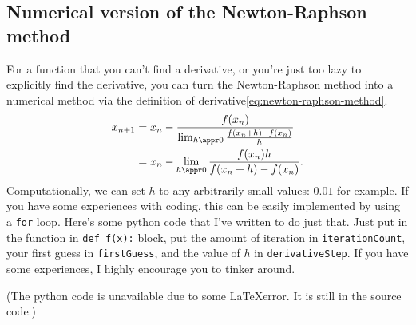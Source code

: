\subsection{Numerical version of the Newton-Raphson method}

For a function that you can't find a derivative, or you're just too lazy to explicitly find the derivative, you can turn the Newton-Raphson method into a numerical method via the definition of derivative\cref{eq:newton-raphson-method}.
\begin{align}
	x_{n + 1} & = x_n - \frac{f(x_n)}{\lim_{h \appr 0}\frac{f(x_n + h) - f(x_n)}{h}} \\
	          & = x_n - \lim_{h \appr 0}\frac{f(x_n)h}{f(x_n + h) - f(x_n)}.
\end{align}
Computationally, we can set $h$ to any arbitrarily small values: $0.01$ for example. If you have some experiences with coding, this can be easily implemented by using a \texttt{for} loop. Here's some python code that I've written to do just that. Just put in the function in \texttt{def f(x):} block, put the amount of iteration in \texttt{iterationCount}, your first guess in \texttt{firstGuess}, and the value of $h$ in \texttt{derivativeStep}. If you have some experiences, I highly encourage you to tinker around.

(The python code is unavailable due to some \LaTeX error. It is still in the source code.)

%
%
%

